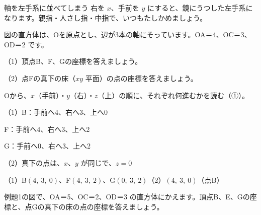 \begin{tsumazuki}{軸を左手系に並べてしまう}
右を $x$、手前を $y$ にすると、鏡にうつした左手系になります。親指・人さし指・中指で、いつもたしかめましょう。
\end{tsumazuki}


\begin{reidai}[直方体の頂点の座標]
図の直方体は、Oを原点とし、辺が3本の軸にそっています。OA＝4、OC＝3、OD＝2 です。\par
（1）頂点B、F、Gの座標を答えましょう。\par
（2）点Fの真下の床（$xy$ 平面）の点の座標を答えましょう。\par
\noindent\begin{minipage}[c]{0.4\linewidth}
\centering
{}
\end{minipage}\hfill
\begin{minipage}[c]{0.57\linewidth}
\kangaekata Oから、$x$（手前）・$y$（右）・$z$（上）の順に、それぞれ何進むかを読む（①）。\par
\shiki（1）B：手前へ4、右へ3、上へ0\par
\hspace*{4.6\zw}F：手前へ4、右へ3、上へ2\par
\hspace*{4.6\zw}G：手前へ0、右へ3、上へ2\par
\hspace*{2.6\zw}（2）真下の点は、$x$、$y$ が同じで、$z=0$\par
\kotae （1）B$(4,\ 3,\ 0)$、F$(4,\ 3,\ 2)$、G$(0,\ 3,\ 2)$\quad（2）$(4,\ 3,\ 0)$（点B）
\end{minipage}
\end{reidai}

\begin{jibun}
例題1の図で、OA＝5、OC＝2、OD＝3 の直方体にかえます。頂点B、E、Gの座標と、点Gの真下の床の点の座標を答えましょう。
\end{jibun}

